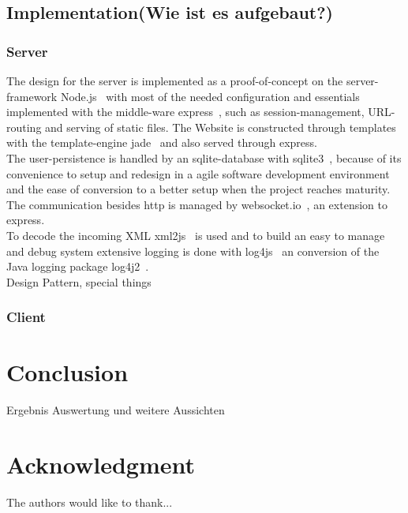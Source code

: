 \documentclass[journal]{IEEEtran}
\begin{document}
\subsection{Implementation(Wie ist es aufgebaut?)}
\subsubsection{Server}
The design for the server is implemented as a proof-of-concept on the server-framework Node.js~\cite{Node.js} with most of the needed configuration and essentials implemented with the middle-ware express~\cite{express}, such as session-management, URL-routing and serving of static files. The Website is constructed through templates with the template-engine jade~\cite{jade} and also served through express.\\
The user-persistence is handled by an sqlite-database with sqlite3~\cite{sqlite3}, because of its convenience to setup and redesign in a agile software development environment~\cite{agile_devel} and the ease of conversion to a better setup when the project reaches maturity.\\
The communication besides http is managed by websocket.io~\cite{websocket.io}\cite{smash_node.js}, an extension to express.\\ 
To decode the incoming XML xml2js~\cite{xml2js} is used and to build an easy to manage and debug system extensive logging is done with log4js~\cite{log4js} an conversion of the Java logging package log4j2~\cite{log4j2}.\\
Design Pattern, special things\\[3mm]
\subsubsection{Client}
\section{Conclusion}
Ergebnis Auswertung und weitere Aussichten

\section*{Acknowledgment}

The authors would like to thank...
\end{document}
